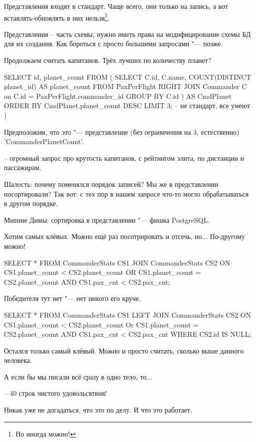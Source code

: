 Представления входят в стандарт.
Чаще всего, они только на запись, а вот вставлять-обновлять в них нельзя\footnote{Но иногда можно!}.

Представления -- часть схемы, нужно иметь права на модифицирование схемы БД для их создания.
Как бороться с просто большими запросами "--- позже.

Продолжаем считать капитанов.
Трёх лучших по количеству планет?
\begin{sqlcode}
SELECT
	id, planet_count
	FROM (
	SELECT C.id, C.name, COUNT(DISTINCT planet_id) AS planet_count
		FROM PaxPerFlight
		RIGHT JOIN Commander C on C.id = PaxPerFlight.commander_id
		GROUP BY C.id
	) AS CmdPlanet
	ORDER BY CmdPlanet.planet_count DESC
	LIMIT 3; -- не стандарт, все умеют
)
\end{sqlcode}
Предположим, что это "--- представление (без ограничения на 3, естественно) \sql'CommanderPlanetCount'.

\begin{sqlcode}
-- огромный запрос про крутость капитанов, с рейтингом элита, по дистанции и пассажирам.
\end{sqlcode}

Шалость: почему поменялся порядок записей? Мы же в представлении посортировали?
Так вот: с тех пор в нашем запросе что-то могло обрабатываться в другом порядке.
\begin{Rem}
	Мнение Димы: сортировка в представлении "--- фишка PostgreSQL.
\end{Rem}

Хотим самых клёвых.
Можно ещё раз посотрировать и отсечь, но... По-другому можно!
\begin{sqlcode}
SELECT *
	FROM CommanderStats CS1
	JOIN CommanderStats CS2
	ON CS1.planet_count < CS2.planet_count
		OR CS1.planet_count = CS2.planet_count AND CS1.pax_cnt < CS2.pax_cnt;
\end{sqlcode}
Победителя тут нет "--- нет никого его круче.
\begin{sqlcode}
SELECT
	*
	FROM CommanderStats CS1
	LEFT JOIN CommanderStats CS2
	ON CS1.planet_count < CS2.planet_count
	Or CS1.planet_count = CS2.planet_count AND CS1.pax_cnt < CS2.pax_cnt
	WHERE CS2.id IS NULL;
\end{sqlcode}
Остался только самый клёвый.
Можно и просто считать, сколько выше данного человека.

А если бы мы писали всё сразу в одно тело, то...
\begin{sqlcode}
-- 40 строк чистого удовольсвтвия!
\end{sqlcode}
Никак уже не догадаться, что это по делу.
И что это работает.

